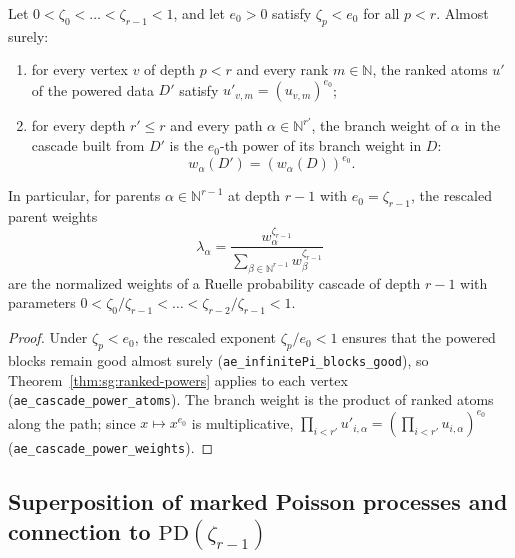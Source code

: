 \begin{theorem}\label{thm:sg:lemma26}
  \leanok
Let $0 < \zeta_0 < \dots < \zeta_{r-1} < 1$, and let $e_0 > 0$ satisfy $\zeta_p < e_0$ for all $p < r$.
Almost surely:
\begin{enumerate}
\item for every vertex $v$ of depth $p < r$ and every rank $m \in \mathbb N$, the ranked atoms $u'$ of the powered data $D'$ satisfy $u'_{v, m} = (u_{v, m})^{e_0}$;
\item for every depth $r' \le r$ and every path $\alpha \in \mathbb N^{r'}$, the branch weight of $\alpha$ in the cascade built from $D'$ is the $e_0$-th power of its branch weight in $D$:
\[
 w_\alpha(D') = (w_\alpha(D))^{e_0} .
\]
\end{enumerate}
In particular, for parents $\alpha \in \mathbb N^{r-1}$ at depth $r-1$ with $e_0 = \zeta_{r-1}$, the rescaled parent weights
\[
 \lambda_\alpha = \frac{w_\alpha^{\zeta_{r-1}}}{\sum_{\beta \in \mathbb N^{r-1}} w_\beta^{\zeta_{r-1}}}
\]
are the normalized weights of a Ruelle probability cascade of depth $r-1$ with parameters $0 < \zeta_0 / \zeta_{r-1} < \dots < \zeta_{r-2} / \zeta_{r-1} < 1$.
\end{theorem}
\begin{proof}
  \leanok
Under $\zeta_p < e_0$, the rescaled exponent $\zeta_p / e_0 < 1$ ensures that the powered blocks remain good almost surely (\texttt{ae\_infinitePi\_blocks\_good}), so Theorem~\ref{thm:sg:ranked-powers} applies to each vertex (\texttt{ae\_cascade\_power\_atoms}). The branch weight is the product of ranked atoms along the path; since $x \mapsto x^{e_0}$ is multiplicative, $\prod_{i < r'} u'_{i, \alpha} = (\prod_{i < r'} u_{i, \alpha})^{e_0}$ (\texttt{ae\_cascade\_power\_weights}).
\end{proof}

\subsection*{Superposition of marked Poisson processes and connection to $\mathrm{PD}(\zeta_{r-1})$}

